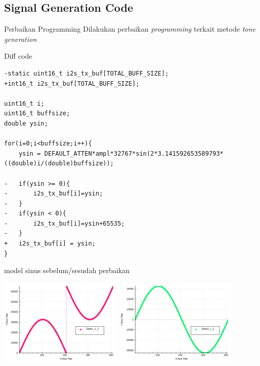 \documentclass[table,dvipsnames]{beamer}
\begin{document}
	\begin{frame}[fragile]
		\subsection{Signal Generation Code}
		\begin{exampleblock}{Perbaikan Programming}
			Dilakukan perbaikan \textit{programming} terkait metode \textit{tone generation}
		\end{exampleblock}
	
		\begin{exampleblock}{Diff code}
			\begin{verbatim}
-static uint16_t i2s_tx_buf[TOTAL_BUFF_SIZE];
+int16_t i2s_tx_buf[TOTAL_BUFF_SIZE];

uint16_t i;
uint16_t buffsize;
double ysin;

for(i=0;i<buffsize;i++){
	ysin = DEFAULT_ATTEN*ampl*32767*sin(2*3.141592653589793*((double)i/(double)buffsize));
	
-	if(ysin >= 0){
-		i2s_tx_buf[i]=ysin;
-	}
-	if(ysin < 0){
-		i2s_tx_buf[i]=ysin+65535;
-	}
+ 	i2s_tx_buf[i] = ysin;
}
			\end{verbatim}
		\end{exampleblock}
	\end{frame}

	\begin{frame}
		\begin{exampleblock}{model sinus sebelum/sesudah perbaikan}
			\begin{center}
				\includegraphics[width=165pt]{images/weird_sine}
				\includegraphics[width=165pt]{images/normal_sine}
			\end{center}
		\end{exampleblock}
	\end{frame}
	
\end{document}
